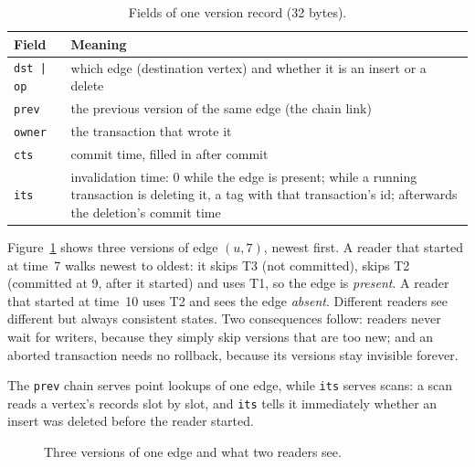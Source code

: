 \documentclass[11pt,a4paper,oneside]{report}
\newcommand{\code}[1]{\texttt{#1}}
\begin{document}
\begin{table}[H]
\caption{Fields of one version record (32 bytes).}
\label{tab:record}
\small
\begin{singlespace}
\begin{tabular}{@{}P{2.2cm}P{12.8cm}@{}}
\toprule
Field & Meaning \\
\midrule
\code{dst\,|\,op} & which edge (destination vertex) and whether it is an insert or a delete \\
\code{prev} & the previous version of the same edge (the chain link) \\
\code{owner} & the transaction that wrote it \\
\code{cts} & commit time, filled in after commit \\
\code{its} & invalidation time: 0 while the edge is present; while a running transaction is deleting it, a tag with
  that transaction's id; afterwards the deletion's commit time \\
\bottomrule
\end{tabular}
\end{singlespace}
\end{table}

Figure~\ref{fig:chain} shows three versions of edge $(u,7)$, newest first. A reader that started at time~7 walks newest
to oldest: it skips T3 (not committed), skips T2 (committed at 9, after it started) and uses T1, so the edge is
\emph{present}. A reader that started at time~10 uses T2 and sees the edge \emph{absent}. Different readers see
different but always consistent states. Two consequences follow: readers never wait for writers, because they simply
skip versions that are too new; and an aborted transaction needs no rollback, because its versions stay invisible
forever.

The \code{prev} chain serves point lookups of one edge, while \code{its} serves scans: a scan reads a vertex's records
slot by slot, and \code{its} tells it immediately whether an insert was deleted before the reader started.

\begin{figure}[H]
\centering
{}
\caption{Three versions of one edge and what two readers see.}
\label{fig:chain}
\end{figure}
\end{document}
